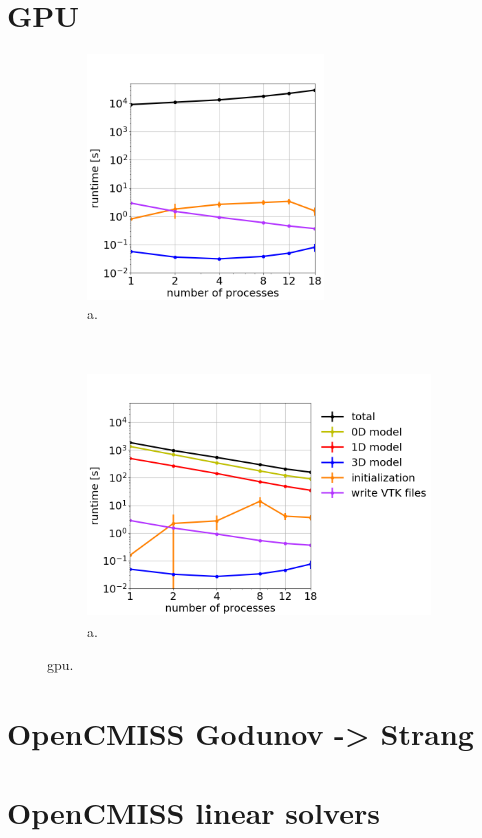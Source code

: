 \section{GPU}
\begin{figure}%
  \centering%
  \begin{subfigure}[t]{0.48\textwidth}%
    \centering%
    \includegraphics[height=6.5cm]{images/results/studies/16_hodgkin_huxley_gpu.png}%
    \caption{a.}%
    \label{fig:16_hodgkin_huxley_gpu}%
  \end{subfigure}
  \,
  \begin{subfigure}[t]{0.48\textwidth}%
    \centering%
    \includegraphics[height=6.5cm]{images/results/studies/16_hodgkin_huxley_cpu.png}%
    \caption{a.}%
    \label{fig:16_hodgkin_huxley_cpu}%
  \end{subfigure}   
  \caption{gpu.}%
  \label{fig:16_hodgkin_huxley_cpu_gpu}%
\end{figure}%



\section{OpenCMISS Godunov -> Strang}
\section{OpenCMISS linear solvers}
